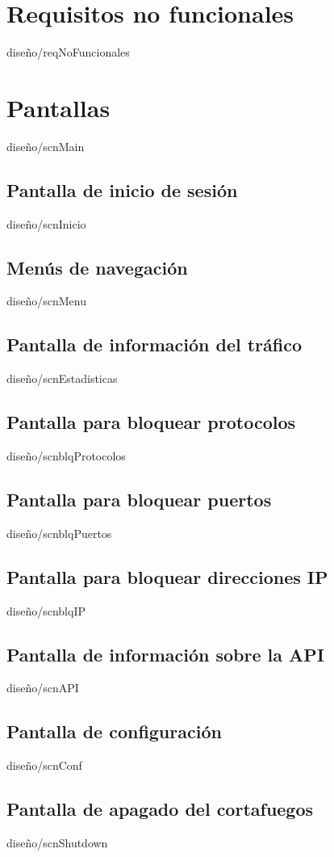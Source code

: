 \documentclass[epsbased,copyright,final,printable,covers,extendedindex,firstnumbered,tfg,gnuplot]{tfgtfmthesisuam}
\begin{document}
    \section{Requisitos no funcionales\label{SEC:reqNoFuncionales}}{diseño/reqNoFuncionales}

    \section{Pantallas\label{SEC:scnMain}}{diseño/scnMain}
    \subsection{Pantalla de inicio de sesión\label{SEC:scnInicio}}{diseño/scnInicio}
    \subsection{Menús de navegación\label{SEC:scnMenu}}{diseño/scnMenu}
    \subsection{Pantalla de información del tráfico\label{SEC:scnEstadisticas}}{diseño/scnEstadisticas}
    \subsection{Pantalla para bloquear protocolos\label{SEC:scnblqProtocolos}}{diseño/scnblqProtocolos}
    \subsection{Pantalla para bloquear puertos\label{SEC:scnblqPuertos}}{diseño/scnblqPuertos}
    \subsection{Pantalla para bloquear direcciones IP\label{SEC:scnblqIP}}{diseño/scnblqIP}
    \subsection{Pantalla de información sobre la API\label{SEC:scnAPI}}{diseño/scnAPI}
    \subsection{Pantalla de configuración\label{SEC:scnConf}}{diseño/scnConf}
    \subsection{Pantalla de apagado del cortafuegos\label{SEC:scnShutdown}}{diseño/scnShutdown}
    
\end{document}
